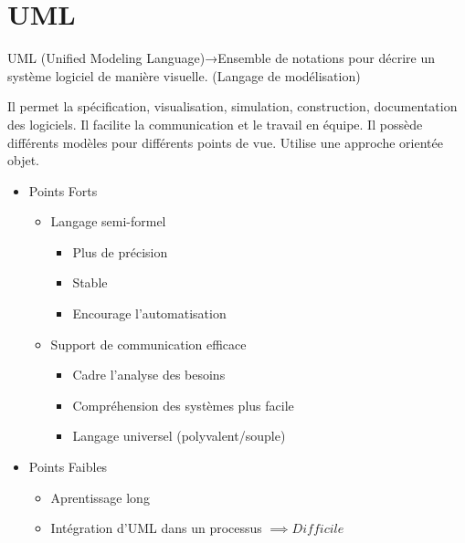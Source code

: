 \chapter{UML}\label{chap:uml}
\begin{definition}
    UML (Unified Modeling Language)→Ensemble de notations pour décrire un système logiciel de manière visuelle. (Langage de modélisation)
\end{definition}
Il permet la spécification, visualisation, simulation, construction, documentation des logiciels.
Il facilite la communication et le travail en équipe.
Il possède différents modèles pour différents points de vue. Utilise une approche orientée objet.
\begin{itemize}
    \item Points Forts
    \begin{itemize}
        \item Langage semi-formel
        \begin{itemize}
            \item Plus de précision
            \item Stable
            \item Encourage l'automatisation
        \end{itemize}
        \item Support de communication efficace
        \begin{itemize}
            \item Cadre l'analyse des besoins
            \item Compréhension des systèmes plus facile
            \item Langage universel (polyvalent/souple)
        \end{itemize}
    \end{itemize}
    \item Points Faibles
    \begin{itemize}
        \item Aprentissage long
        \item Intégration d'UML dans un processus $\implies Difficile$
    \end{itemize}
\end{itemize}
